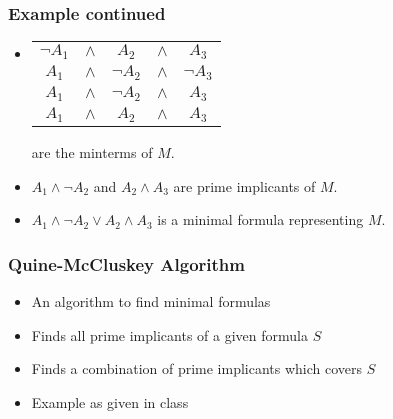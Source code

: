 \documentclass{beamer}
\theoremstyle{remark}
\begin{document}
\begin{frame}
\frametitle{Example continued}
\begin{itemize}

\item
\begin{tabular}{ccccc}
$\lnot A_1$ & $\land$ & $A_2$ & $\land$ & $A_3$ \\
$A_1$ &$\land$& $\lnot A_2$ &$\land$& $\lnot A_3$ \\
$A_1$ & $\land$ & $\lnot A_2$ & $\land$ & $A_3$  \\
$A_1$ & $\land$ & $A_2$ & $\land$ & $A_3$
\end{tabular}

are the  minterms of $M$.

\pause
\item $A_1 \land \lnot A_2$ and $A_2 \land A_3$ are prime implicants of $M$.

\pause
\item $A_1 \land \lnot A_2 \lor A_2 \land A_3$ is a minimal formula representing $M$.
\end{itemize}
\end{frame}

\begin{frame}
\frametitle{Quine-McCluskey Algorithm}
\begin{itemize}
	\item An algorithm to find minimal formulas
	\item Finds all prime implicants of a given formula $S$
	\item Finds a combination of prime implicants which covers $S$
	\item Example as given in class
\end{itemize}
\end{frame}
\end{document}
